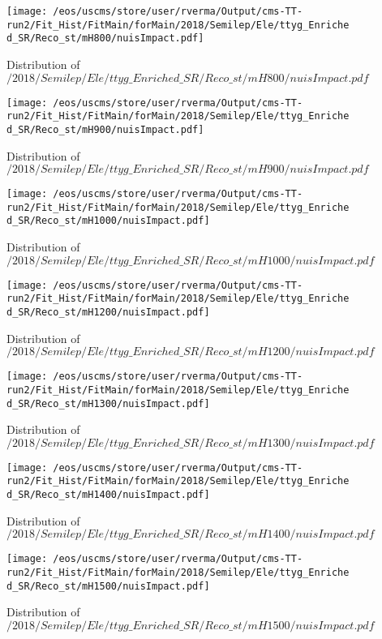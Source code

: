 \begin{figure}
\centering
\texttt{[image: /eos/uscms/store/user/rverma/Output/cms-TT-run2/Fit\_Hist/FitMain/forMain/2018/Semilep/Ele/ttyg\_Enriched\_SR/Reco\_st/mH800/nuisImpact.pdf]}
\caption{Distribution of $/2018/Semilep/Ele/ttyg\_Enriched\_SR/Reco\_st/mH800/nuisImpact.pdf$}
\end{figure}

\begin{figure}
\centering
\texttt{[image: /eos/uscms/store/user/rverma/Output/cms-TT-run2/Fit\_Hist/FitMain/forMain/2018/Semilep/Ele/ttyg\_Enriched\_SR/Reco\_st/mH900/nuisImpact.pdf]}
\caption{Distribution of $/2018/Semilep/Ele/ttyg\_Enriched\_SR/Reco\_st/mH900/nuisImpact.pdf$}
\end{figure}

\begin{figure}
\centering
\texttt{[image: /eos/uscms/store/user/rverma/Output/cms-TT-run2/Fit\_Hist/FitMain/forMain/2018/Semilep/Ele/ttyg\_Enriched\_SR/Reco\_st/mH1000/nuisImpact.pdf]}
\caption{Distribution of $/2018/Semilep/Ele/ttyg\_Enriched\_SR/Reco\_st/mH1000/nuisImpact.pdf$}
\end{figure}

\begin{figure}
\centering
\texttt{[image: /eos/uscms/store/user/rverma/Output/cms-TT-run2/Fit\_Hist/FitMain/forMain/2018/Semilep/Ele/ttyg\_Enriched\_SR/Reco\_st/mH1200/nuisImpact.pdf]}
\caption{Distribution of $/2018/Semilep/Ele/ttyg\_Enriched\_SR/Reco\_st/mH1200/nuisImpact.pdf$}
\end{figure}

\begin{figure}
\centering
\texttt{[image: /eos/uscms/store/user/rverma/Output/cms-TT-run2/Fit\_Hist/FitMain/forMain/2018/Semilep/Ele/ttyg\_Enriched\_SR/Reco\_st/mH1300/nuisImpact.pdf]}
\caption{Distribution of $/2018/Semilep/Ele/ttyg\_Enriched\_SR/Reco\_st/mH1300/nuisImpact.pdf$}
\end{figure}

\begin{figure}
\centering
\texttt{[image: /eos/uscms/store/user/rverma/Output/cms-TT-run2/Fit\_Hist/FitMain/forMain/2018/Semilep/Ele/ttyg\_Enriched\_SR/Reco\_st/mH1400/nuisImpact.pdf]}
\caption{Distribution of $/2018/Semilep/Ele/ttyg\_Enriched\_SR/Reco\_st/mH1400/nuisImpact.pdf$}
\end{figure}

\begin{figure}
\centering
\texttt{[image: /eos/uscms/store/user/rverma/Output/cms-TT-run2/Fit\_Hist/FitMain/forMain/2018/Semilep/Ele/ttyg\_Enriched\_SR/Reco\_st/mH1500/nuisImpact.pdf]}
\caption{Distribution of $/2018/Semilep/Ele/ttyg\_Enriched\_SR/Reco\_st/mH1500/nuisImpact.pdf$}
\end{figure}

